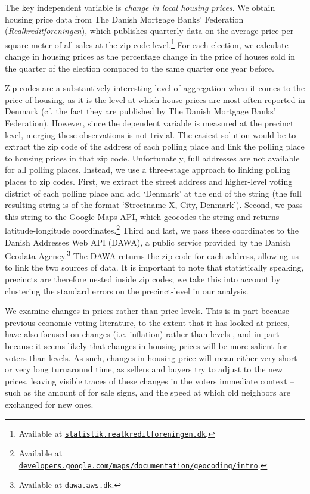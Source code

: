 \documentclass[12pt,a4paper]{article}
\begin{document}
The key independent variable is \textit{change in local housing prices}. We obtain housing price data from The Danish Mortgage Banks' Federation (\textit{Realkreditforeningen}), which publishes quarterly data on the average price per square meter of all sales at the zip code level.\footnote{Available at \texttt{\href{http://statistik.realkreditforeningen.dk/}{statistik.realkreditforeningen.dk}}.} For each election, we calculate change in housing prices as the percentage change in the price of houses sold in the quarter of the election compared to the same quarter one year before. 

Zip codes are a substantively interesting level of aggregation when it comes to the price of housing, as it is the level at which house prices are most often reported in Denmark (cf. the fact they are published by The Danish Mortgage Banks' Federation). However, since the dependent variable is measured at the precinct level, merging these observations is not trivial. The easiest solution would be to extract the zip code of the address of each polling place and link the polling place to housing prices in that zip code. Unfortunately, full addresses are not available for all polling places. Instead, we use a three-stage approach to linking polling places to zip codes. First, we extract the street address and higher-level voting district of each polling place and add `Denmark' at the end of the string (the full resulting string is of the format `Streetname X, City, Denmark'). Second, we pass this string to the Google Maps API, which geocodes the string and returns latitude-longitude coordinates.\footnote{Available at \texttt{\href{https://developers.google.com/maps/documentation/geocoding/intro}{developers.google.com/maps/documentation/geocoding/intro}}.} Third and last, we pass these coordinates to the Danish Addresses Web API (DAWA), a public service provided by the Danish Geodata Agency.\footnote{Available at \texttt{\href{http://dawa.aws.dk/}{dawa.aws.dk}}.} The DAWA returns the zip code for each address, allowing us to link the two sources of data. It is important to note that statistically speaking, precincts are therefore nested inside zip codes; we take this into account by clustering the standard errors on the precinct-level in our analysis.

We examine changes in prices rather than price levels. This is in part because previous economic voting literature, to the extent that it has looked at prices, have also focused on changes (i.e. inflation) rather than levels \citep[cf.][]{kramer1971short}, and in part because it seems likely that changes in housing prices will be more salient for voters than levels. As such, changes in housing price will mean either very short or very long turnaround time, as sellers and buyers try to adjust to the new prices, leaving visible traces of these changes in the voters immediate context -- such as the amount of for sale signs, and the speed at which old neighbors are exchanged for new ones.
\end{document}
